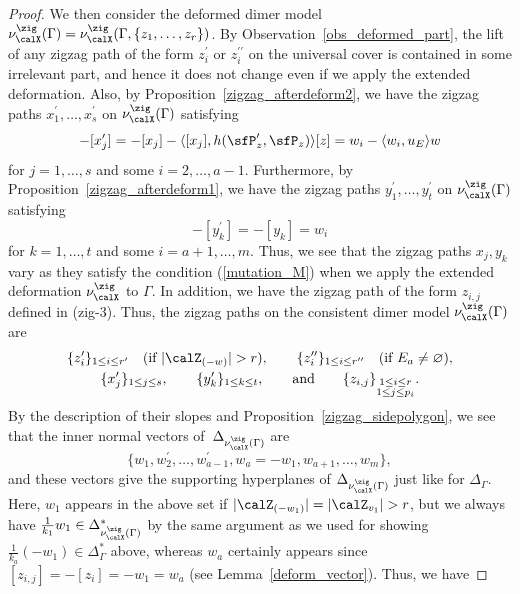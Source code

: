 \begin{proof}
We then consider the deformed dimer model $\nu^\zig_\calX(\Gamma)=\nu^\zig_\calX(\Gamma,\{z_1,\dots,z_r\})$.
By Observation~\ref{obs_deformed_part}, the lift of any zigzag path of the form $z_i^\prime$ or $z_i^{\prime\prime}$ on the universal cover is contained in some irrelevant part, and hence it does not change even if we apply the extended deformation.
Also, by Proposition~\ref{zigzag_afterdeform2}, we have the zigzag paths $x_1^\prime,\dots,x_s^\prime$ on $\nu^\zig_\calX(\Gamma)$ satisfying
\begin{displaymath}
-[x^{\prime}_j]=-[x_j]-\langle [x_j],h(\sfP_z^\prime,\sfP_z)\rangle[z]=w_i-\langle w_i,u_E\rangle w
\end{displaymath}
for $j=1,\dots,s$ and some $i=2,\dots,a-1$.
Furthermore, by Proposition~\ref{zigzag_afterdeform1}, we have the zigzag paths $y_1^\prime,\dots,y_t^\prime$ on $\nu^\zig_\calX(\Gamma)$ satisfying
\begin{displaymath}
-[y_k^\prime]=-[y_k]=w_i
\end{displaymath}
for $k=1,\dots,t$ and some $i=a+1,\dots,m$.
Thus, we see that the zigzag paths $x_j, y_k$ vary as they satisfy the condition (\ref{mutation_M}) when we apply the extended deformation $\nu^\zig_\calX$ to $\Gamma$.
In addition, we have the zigzag path of the form $z_{i,j}$ defined in (zig-3).
Thus, the zigzag paths on the consistent dimer model $\nu^\zig_\calX(\Gamma)$ are
\begin{gather*}
\{z_i^\prime\}_{1\le i\le r^\prime}\quad \text{(if $|\calZ_{(-w)}|>r$)},\qquad \{z_i^{\prime\prime}\}_{1\le i\le r^{\prime\prime}}\quad \text{(if $E_a\neq\varnothing$)},\\
\{x_j^\prime\}_{1\le j\le s},\qquad \{y_k^\prime\}_{1\le k\le t},\qquad \text{and} \qquad \{z_{i,j}\}_{\substack{1\le i\le r \\ 1\le j\le p_i}}.
\end{gather*}
By the description of their slopes and Proposition~\ref{zigzag_sidepolygon}, we see that the inner normal vectors of~$\Delta_{\nu^\zig_\calX(\Gamma)}$ are
\begin{displaymath}
\{w_1,w_2^\prime,\dots,w_{a-1}^\prime,w_a=-w_1, w_{a+1}, \dots,w_m\},
\end{displaymath}
and these vectors give the supporting hyperplanes of $\Delta_{\nu^\zig_\calX(\Gamma)}$ just like for $\Delta_\Gamma$.
Here, $w_1$ appears in the above set if $|\calZ_{(-w_1)}|=|\calZ_{v_1}|>r$,
but we always have $\frac{1}{k_1}w_1\in \Delta_{\nu^\zig_\calX(\Gamma)}^*$ by the same argument as we used for showing $\frac{1}{k_a}(-w_1)\in\Delta_\Gamma^*$ above, whereas $w_a$ certainly appears since $[z_{i,j}]=-[z_i]=-w_1=w_a$ (see Lemma~\ref{deform_vector}). Thus, we have

\end{proof}
